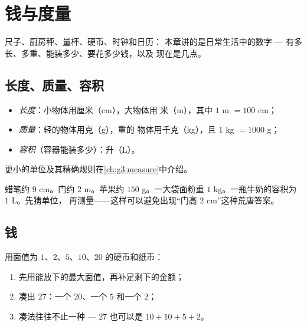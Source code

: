 \chapter{钱与度量}\label{ch:g2:measure}

尺子、厨房秤、量杯、硬币、时钟和日历：
本章讲的是日常生活中的数字 ---
有多长、多重、能装多少、要花多少钱，以及
现在是几点。

\section{长度、质量、容积}

\begin{definition}[日常单位]\label{def:g2:measure:units}
\begin{itemize}
  \item \emph{长度}：小物体用厘米（cm），大物体用
        米（m），其中 $1$ m $= 100$ cm；
  \item \emph{质量}：轻的物体用克（g），重的
        物体用千克（kg），且 $1$ kg $= 1000$ g；
  \item \emph{容积}（容器能装多少）：升（L）。
\end{itemize}
更小的单位及其精确规则在\cref{ch:g3:measure}中介绍。
\end{definition}

\begin{example}[用哪个单位？]\label{ex:g2:measure:choose}
蜡笔约 $9$ cm。门约 $2$ m。苹果约 $150$
g。一大袋面粉重 $1$ kg。一瓶牛奶的容积为 $1$ L。先猜单位，
再测量——这样可以避免出现“门高 $2$
cm”这种荒唐答案。
\end{example}

\section{钱}

\begin{method}[凑出金额]\label{met:g2:measure:money}
用面值为 $1$、$2$、$5$、$10$、$20$ 的硬币和纸币：
\begin{enumerate}
  \item 先用能放下的最大面值，再补足剩下的金额；
  \item 凑出 $27$：一个 $20$、一个 $5$ 和一个 $2$；
  \item 凑法往往不止一种 --- $27$ 也可以是 $10 + 10 + 5 +
        2$。
\end{enumerate}
\end{method}

